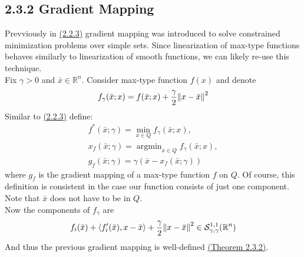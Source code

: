 \documentclass[12pt,a4paper]{article}
\DeclareMathOperator*{\argmin}{argmin}
\begin{document}
	 \subsection*{2.3.2 Gradient Mapping}\label{sec:gradmap232}
	 Prevviously in \hyperref[sec223GradMap]{(2.2.3)} gradient mapping was introduced to solve constrained minimization problems over simple sets. Since linearization of max-type functions behaves similarly to linearization of smooth functions, we can likely re-use this technique. \\
	 Fix $\gamma > 0$ and $\bar{x} \in \mathbb{R}^n$. Consider max-type function $f(x)$ and denote
	 \begin{align*}
	 	f_{\gamma}(\bar{x};x) = f(\bar{x};x) + \frac{\gamma}{2}\norm{x - \bar{x}}^2
	 \end{align*}
	 Similar to \hyperref[sec223GradMap]{(2.2.3)} define:
	 \begin{align*}
	 	f^*(\bar{x};\gamma) = \min_{x \in Q}f_{\gamma}(\bar{x};x), \\
	 	x_f(\bar{x};\gamma) = \argmin_{x \in Q}f_{\gamma}(\bar{x};x), \\
	 	g_f(\bar{x};\gamma) = \gamma(\bar{x} - x_f(\bar{x};\gamma))
	 \end{align*}
	 where $g_f$ is the gradient mapping of a max-type function $f$ on $Q$. Of course, this definition is consistent in the case our function consists of just one component. Note that $\bar{x}$ does not have to be in $Q$. \\
	 Now the components of $f_{\gamma}$ are
	 \begin{align*}
	 	f_i(\bar{x}) + \langle f_i'(\bar{x}), x - \bar{x} \rangle + \frac{\gamma}{2}\norm{x - \bar{x}}^2 \in \mathcal{S}_{\gamma,\gamma}^{1,1}(\mathbb{R}^n)
	 \end{align*}
	 And thus the previous gradient mapping is well-defined \hyperref[thm232]{(Theorem 2.3.2)}. \\
\end{document}
